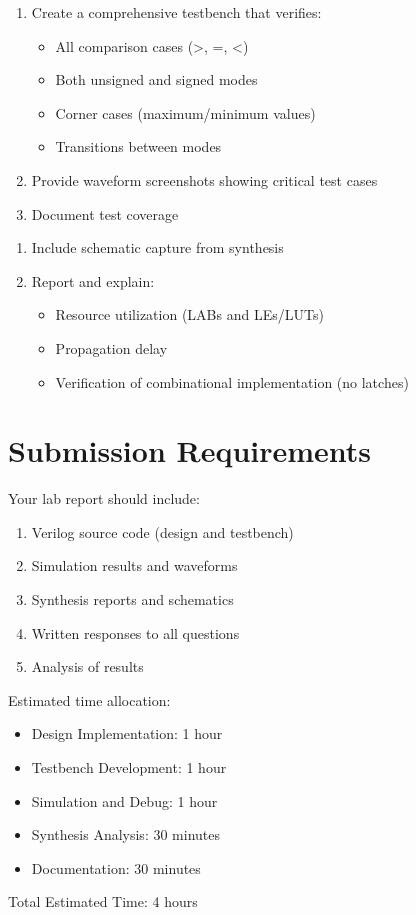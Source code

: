 \documentclass[12pt]{betterjournal}
\begin{document}
\begin{question}[Verification]
\begin{enumerate}
    \item Create a comprehensive testbench that verifies:
    \begin{itemize}
        \item All comparison cases (>, =, <)
        \item Both unsigned and signed modes
        \item Corner cases (maximum/minimum values)
        \item Transitions between modes
    \end{itemize}
    \item Provide waveform screenshots showing critical test cases
    \item Document test coverage
\end{enumerate}
\end{question}

\begin{question}
\begin{enumerate}
    \item Include schematic capture from synthesis
    \item Report and explain:
    \begin{itemize}
        \item Resource utilization (LABs and LEs/LUTs)
        \item Propagation delay
        \item Verification of combinational implementation (no latches)
    \end{itemize}
\end{enumerate}
\end{question}

\section{Submission Requirements}
Your lab report should include:
\begin{enumerate}
    \item Verilog source code (design and testbench)
    \item Simulation results and waveforms
    \item Synthesis reports and schematics
    \item Written responses to all questions
    \item Analysis of results
\end{enumerate}

\begin{extra}[frametitle={Time Management}]
Estimated time allocation:
\begin{itemize}
    \item Design Implementation: 1 hour
    \item Testbench Development: 1 hour
    \item Simulation and Debug: 1 hour
    \item Synthesis Analysis: 30 minutes
    \item Documentation: 30 minutes
\end{itemize}
Total Estimated Time: 4 hours
\end{extra}
\end{document}
